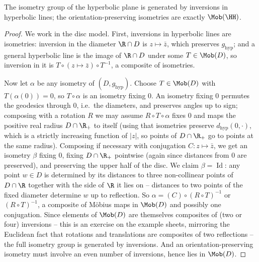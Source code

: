 \begin{theorem}
    The isometry group of the hyperbolic plane is generated by inversions in hyperbolic lines; the orientation-preserving isometries are exactly $\Mob(\HH)$.
\end{theorem}
\begin{proof}
    We work in the disc model. First, inversions in hyperbolic lines are isometries: inversion in the diameter $\R \cap D$ is $z \mapsto \bar z$, which preserves $g_{\mathrm{hyp}}$; and a general hyperbolic line is the image of $\R \cap D$ under some $T \in \Mob(D)$, so inversion in it is $T \circ (z \mapsto \bar z) \circ T^{-1}$, a composite of isometries.

    Now let $\alpha$ be any isometry of $(D, g_{\mathrm{hyp}})$. Choose $T \in \Mob(D)$ with $T(\alpha(0)) = 0$, so $T \circ \alpha$ is an isometry fixing $0$. An isometry fixing $0$ permutes the geodesics through $0$, i.e.\ the diameters, and preserves angles up to sign; composing with a rotation $R$ we may assume $R \circ T \circ \alpha$ fixes $0$ and maps the positive real radius $D \cap \R_{+}$ to itself (using that isometries preserve $d_{\mathrm{hyp}}(0, \cdot)$, which is a strictly increasing function of $|z|$, so points of $D \cap \R_+$ go to points at the same radius). Composing if necessary with conjugation $C: z \mapsto \bar z$, we get an isometry $\beta$ fixing $0$, fixing $D \cap \R_+$ pointwise (again since distances from $0$ are preserved), and preserving the upper half of the disc. We claim $\beta = \operatorname{Id}$: any point $w \in D$ is determined by its distances to three non-collinear points of $D \cap \R$ together with the side of $\R$ it lies on -- distances to two points of the fixed diameter determine $w$ up to reflection.
    So $\alpha = (C) \circ (R \circ T)^{-1}$ or $(R \circ T)^{-1}$, a composite of M\"obius maps in $\Mob(D)$ and possibly one conjugation. Since elements of $\Mob(D)$ are themselves composites of (two or four) inversions -- this is an exercise on the example sheets, mirroring the Euclidean fact that rotations and translations are composites of two reflections -- the full isometry group is generated by inversions. And an orientation-preserving isometry must involve an even number of inversions, hence lies in $\Mob(D)$.
\end{proof}

